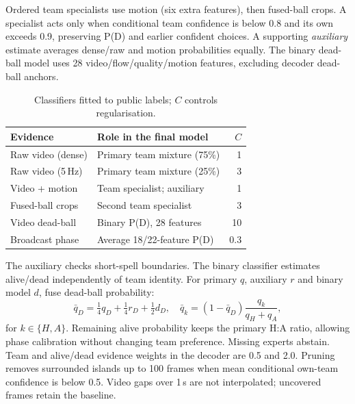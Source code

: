\documentclass[conference,a4paper,10pt]{IEEEtran}
\begin{document}
Ordered team specialists use motion (six extra features), then fused-ball crops.
A specialist acts only when conditional team confidence is below 0.8 and its
own exceeds 0.9, preserving P(D) and earlier confident choices. A supporting
\emph{auxiliary} estimate averages dense/raw and motion probabilities equally.
The binary dead-ball model uses 28 video/flow/quality/motion features,
excluding decoder dead-ball anchors.

\begin{table}[!t]
\centering
\caption{Classifiers fitted to public labels; $C$ controls regularisation.}
\label{tab:roles}
\footnotesize
\begin{tabular}{@{}p{29mm}p{37mm}r@{}}
\toprule
Evidence & Role in the final model & $C$\\
\midrule
Raw video (dense) & Primary team mixture (75\%) & 1\\
Raw video (5\,Hz) & Primary team mixture (25\%) & 3\\
Video + motion & Team specialist; auxiliary & 1\\
Fused-ball crops & Second team specialist & 3\\
Video dead-ball & Binary P(D), 28 features & 10\\
Broadcast phase & Average 18/22-feature P(D) & 0.3\\
\bottomrule
\end{tabular}
\end{table}

The auxiliary checks short-spell boundaries. The binary classifier estimates
alive/dead independently of team identity. For primary $q$, auxiliary $r$ and
binary model $d$, fuse dead-ball probability:
\begin{equation}
\bar q_D=\tfrac14q_D+\tfrac14r_D+\tfrac12d_D,\quad
\bar q_k=(1-\bar q_D)\frac{q_k}{q_H+q_A},
\end{equation}
for $k\in\{H,A\}$. Remaining alive probability keeps the primary H:A ratio,
allowing phase calibration without changing team preference. Missing experts
abstain. Team and alive/dead evidence weights in the decoder are 0.5 and 2.0.
Pruning removes surrounded islands up to 100 frames when mean conditional
own-team confidence is below 0.5. Video gaps over 1\,s are not interpolated;
uncovered frames retain the baseline.
\end{document}
